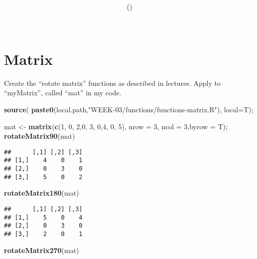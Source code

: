 \documentclass{article}
\title{\hmwkCourse \\ \hmwkTitle}
\author{\hmwkAuthor \\ (\hmwkEmail) \\ \hmwkWSU \\[0.5in] \hmwkInstructor }
\date{\hmwkDate}
\newenvironment{Shaded}{\begin{snugshade}}{\end{snugshade}}
\newcommand{\DataTypeTok}[1]{\textcolor[rgb]{0.13,0.29,0.53}{#1}}
\newcommand{\DecValTok}[1]{\textcolor[rgb]{0.00,0.00,0.81}{#1}}
\newcommand{\KeywordTok}[1]{\textcolor[rgb]{0.13,0.29,0.53}{\textbf{#1}}}
\newcommand{\NormalTok}[1]{#1}
\newcommand{\StringTok}[1]{\textcolor[rgb]{0.31,0.60,0.02}{#1}}
\begin{document}
\maketitle



\hypertarget{matrix}{%
\section{Matrix}\label{matrix}}

Create the ``rotate matrix'' functions as described in lectures. Apply
to ``myMatrix'', called ``mat'' in my code.

\begin{Shaded}
\begin{Highlighting}[]
\KeywordTok{source}\NormalTok{( }\KeywordTok{paste0}\NormalTok{(local.path,}\StringTok{"WEEK{-}03/functions/functions{-}matrix.R"}\NormalTok{), }\DataTypeTok{local=}\NormalTok{T);}

\NormalTok{mat \textless{}{-}}\StringTok{ }\KeywordTok{matrix}\NormalTok{(}\KeywordTok{c}\NormalTok{(}\DecValTok{1}\NormalTok{, }\DecValTok{0}\NormalTok{, }\DecValTok{2}\NormalTok{,}\DecValTok{0}\NormalTok{, }\DecValTok{3}\NormalTok{, }\DecValTok{0}\NormalTok{,}\DecValTok{4}\NormalTok{, }\DecValTok{0}\NormalTok{, }\DecValTok{5}\NormalTok{), }\DataTypeTok{nrow =} \DecValTok{3}\NormalTok{, }\DataTypeTok{ncol =} \DecValTok{3}\NormalTok{,}\DataTypeTok{byrow =}\NormalTok{ T);}
\KeywordTok{rotateMatrix90}\NormalTok{(mat)}
\end{Highlighting}
\end{Shaded}

\begin{verbatim}
##      [,1] [,2] [,3]
## [1,]    4    0    1
## [2,]    0    3    0
## [3,]    5    0    2
\end{verbatim}

\begin{Shaded}
\begin{Highlighting}[]
\KeywordTok{rotateMatrix180}\NormalTok{(mat)}
\end{Highlighting}
\end{Shaded}

\begin{verbatim}
##      [,1] [,2] [,3]
## [1,]    5    0    4
## [2,]    0    3    0
## [3,]    2    0    1
\end{verbatim}

\begin{Shaded}
\begin{Highlighting}[]
\KeywordTok{rotateMatrix270}\NormalTok{(mat)}
\end{Highlighting}
\end{Shaded}
\end{document}
